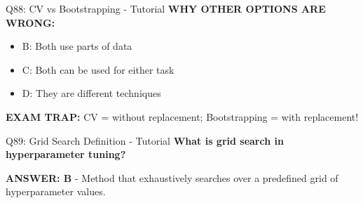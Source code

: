 \documentclass[8pt]{beamer}
\begin{document}
\begin{frame}{Q88: CV vs Bootstrapping - Tutorial}
		\vspace{0.05cm}
		\textcolor{myred}{\textbf{WHY OTHER OPTIONS ARE WRONG:}}
		\begin{itemize}
			\item \textcolor{myred}{B:} Both use parts of data
			\item \textcolor{myred}{C:} Both can be used for either task
			\item \textcolor{myred}{D:} They are different techniques
		\end{itemize}
		
		\textcolor{myred}{\textbf{EXAM TRAP:}} CV = without replacement; Bootstrapping = with replacement!
	\end{frame}
	
	\begin{frame}{Q89: Grid Search Definition - Tutorial}
		\fontsize{6.5}{7.5}\selectfont
		\textbf{What is grid search in hyperparameter tuning?}
		
		\vspace{0.05cm}
		\textcolor{myblue}{\textbf{ANSWER: B}} - Method that exhaustively searches over a predefined grid of hyperparameter values.
		

\end{frame}
\end{document}
